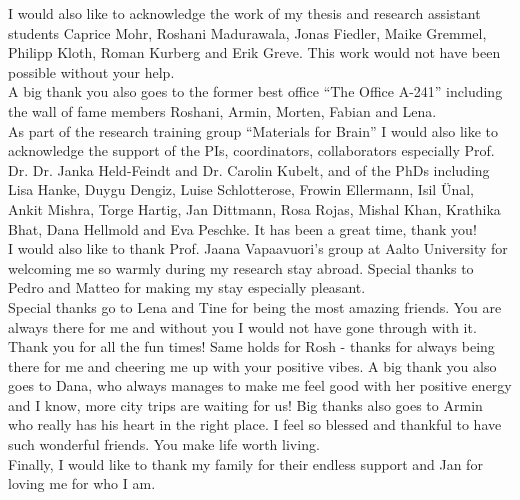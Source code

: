 I would also like to acknowledge the work of my thesis and research assistant students Caprice Mohr, Roshani Madurawala, Jonas Fiedler, Maike Gremmel, Philipp Kloth, Roman Kurberg and Erik Greve. This work would not have been possible without your help.\\

A big thank you also goes to the former best office ``The Office A-241'' including the wall of fame members Roshani, Armin, Morten, Fabian and Lena.\\ 

As part of the research training group ``Materials for Brain'' I would also like to acknowledge the support of the PIs, coordinators, collaborators especially Prof. Dr. Dr. Janka Held-Feindt and Dr. Carolin Kubelt, and of the PhDs including Lisa Hanke, Duygu Dengiz, Luise Schlotterose, Frowin Ellermann, Isil Ünal, Ankit Mishra, Torge Hartig, Jan Dittmann, Rosa Rojas, Mishal Khan, Krathika Bhat, Dana Hellmold and Eva Peschke. It has been a great time, thank you!\\

I would also like to thank Prof. Jaana Vapaavuori's group at Aalto University for welcoming me so warmly during my research stay abroad. Special thanks to Pedro and Matteo for making my stay especially pleasant.\\

Special thanks go to Lena and Tine for being the most amazing friends. You are always there for me and without you I would not have gone through with it. Thank you for all the fun times!  Same holds for Rosh - thanks for always being there for me and cheering me up with your positive vibes. A big thank you also goes to Dana, who always manages to make me feel good with her positive energy and I know, more city trips are waiting for us! Big thanks also goes to Armin who really has his heart in the right place. I feel so blessed and thankful to have such wonderful friends. You make life worth living. \\ 

Finally, I would like to thank my family for their endless support and Jan for loving me for who I am. 






